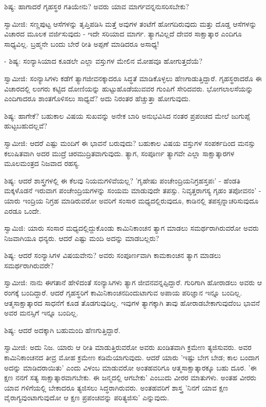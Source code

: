 ಶಿಷ್ಯ: ಹಾಗಾದರೆ ಗೃಹಸ್ಥರ ಗತಿಯೇನು? ಅವರು ಯಾವ ಮಾರ್ಗವನ್ನನುಸರಿಸಬೇಕು?

ಸ್ವಾಮೀಜಿ: ಸಣ್ಣಪುಟ್ಟ ಆಸೆಗಳನ್ನು ತೃಪ್ತಿಪಡಿಸಿ ಮತ್ತೆ ಅವುಗಳ ತಂಟೆಗೆ ಹೋಗದಿರುವುದು ಮತ್ತು ದೊಡ್ಡ ಆಸೆಗಳನ್ನು ವಿಚಾರದ ಮೂಲಕ ವರ್ಜಿಸುವುದು - ಇದೇ ಸರಿಯಾದ ಮಾರ್ಗ. ತ್ಯಾಗವಿಲ್ಲದೆ ದೇವರ ಸಾಕ್ಷಾತ್ಕಾರ ಎಂದಿಗೂ ಸಾಧ್ಯವಿಲ್ಲ. ಬ್ರಹ್ಮನೇ ಬಂದು ಬೇರೆ ರೀತಿ ಅಪ್ಪಣೆ ಮಾಡಿದರೂ ಅಸಾಧ್ಯ!

- ಶಿಷ್ಯ: ಸಂನ್ಯಾಸಿಯಾದ ಕೂಡಲೇ ಎಲ್ಲಾ ವಸ್ತುಗಳ ಮೇಲಿನ ಮೋಹವೂ ಹೋಗುತ್ತದೆಯೆ?

ಸ್ವಾಮೀಜಿ: ಸಂನ್ಯಾಸಿಗಳು ಕಡೆಗೆ ತ್ಯಾಗಜೀವನಕ್ಕಾದರೂ ಸಿದ್ಧತೆ ಮಾಡಿಕೊಳ್ಳಲು ಹೆಣಗಾಡುತ್ತಿದ್ದಾರೆ. ಗೃಹಸ್ಥರಾದರೊ ಈ ವಿಚಾರದಲ್ಲಿ ಲಂಗರು ಕಟ್ಟಿದ ದೋಣಿಯನ್ನು ಹುಟ್ಟುಹೊಡೆಯುವವರ ಗುಂಪಿಗೆ ಸೇರಿದವರು. ಭೋಗಲಾಲಸೆಯನ್ನು ಎಂದಿಗಾದರೂ ಶಾಂತಗೊಳಿಸಲು ಸಾಧ್ಯವೆ? ಅದು ನಿರಂತರ ಹೆಚ್ಚುತ್ತಾ ಹೋಗುವುದು.

ಶಿಷ್ಯ: ಹಾಗೇಕೆ? ಬಹುಕಾಲ ವಿಷಯ ಸುಖವನ್ನು ಅನೇಕ ಬಾರಿ ಅನುಭವಿಸಿದ ನಂತರ ಪ್ರಪಂಚದ ಮೇಲೆ ಜುಗುಪ್ಸೆ ಹುಟ್ಟಬಹುದಲ್ಲವೆ?

ಸ್ವಾಮೀಜಿ: ಆದರೆ ಎಷ್ಟು ಮಂದಿಗೆ ಈ ಭಾವನೆ ಬರುವುದು? ಬಹುಕಾಲ ವಿಷಯ ವಸ್ತುಗಳ ಸಂಪರ್ಕದಿಂದ ಮನಸ್ಸು ಕಲುಷಿತವಾಗಿ ಅದರ ಮುದ್ರೆ ಚಿರಮುದ್ರಿತವಾಗುವುದು. ತ್ಯಾಗ, ಸಂಪೂರ್ಣ ತ್ಯಾಗವೇ ಎಲ್ಲಾ ಸಾಕ್ಷಾತ್ಕಾರಗಳ ಮೂಲಮಂತ್ರದ ನಿಜವಾದ ರಹಸ್ಯ.

ಶಿಷ್ಯ: ಆದರೆ ಶಾಸ್ತ್ರಗಳಲ್ಲಿ ಈ ಕೆಲವು ನಿಯಮಗಳಿವೆಯಲ್ಲ? 'ಗೃಹೇಷು ಪಂಚೇಂದ್ರಿಯನಿಗ್ರಹಸ್ತಪಃ' - ಹೆಂಡತಿ ಮಕ್ಕಳೊಡನೆ ಇರುವಾಗ ಪಂಚೇಂದ್ರಿಯಗಳನ್ನು ಸಂಯಮ ಮಾಡುವುದೇ ತಪಸ್ಸು. ನಿವೃತ್ತರಾಗಸ್ಯ ಗೃಹಂ ತಪೋವನಂ' - ಯಾರು ಇಂದ್ರಿಯ ನಿಗ್ರಹ ಮಾಡಿರುವರೋ ಅವರಿಗೆ ಸಂಸಾರ ಮಧ್ಯದಲ್ಲಿರುವುದೂ, ಕಾಡಿನಲ್ಲಿ ತಪಸ್ಸನ್ನಾಚರಿಸುವುದೂ ಎರಡೂ ಒಂದೇ.

ಸ್ವಾಮಿಜಿ: ಯಾರು ಸಂಸಾರ ಮಧ್ಯದಲ್ಲಿದ್ದುಕೊಂಡು ಕಾಮಿನಿಕಾಂಚನ ತ್ಯಾಗ ಮಾಡಲು ಸಮರ್ಥರಾಗಿರುವರೋ ಅವರು ನಿಜವಾಗಿಯೂ ಧನ್ಯರು. ಆದರೆ ಎಷ್ಟು ಮಂದಿ ಅದನ್ನು ಮಾಡಬಲ್ಲರು?

ಶಿಷ್ಯ: ಆದರೆ ಸಂನ್ಯಾಸಿಗಳ ವಿಷಯವೇನು? ಅವರು ಸಂಪೂರ್ಣವಾಗಿ ಕಾಮಕಾಂಚನ ತ್ಯಾಗ ಮಾಡಲು ಸಮರ್ಥರಾಗಿರುವರೇ?

ಸ್ವಾಮೀಜಿ: ನಾನು ಈಗತಾನೆ ಹೇಳಿದಂತೆ ಸಂನ್ಯಾಸಿಗಳು ತ್ಯಾಗ ಜೀವನವನ್ನಪ್ಪಿದ್ದಾರೆ. ಗುರಿಗಾಗಿ ಹೋರಾಡಲು ಅವರು ಆ ರಂಗಕ್ಕೆ ಬಂದಿದ್ದಾರೆ. ಆದರೆ ಗೃಹಸ್ಥರಿಗೆ ಕಾಮಿನಿಕಾಂಚನದಿಂದುಟಾಗುವ ಅಪಾಯ ಪರಿಜ್ಞಾನ ಇನ್ನೂ ಬಂದಿಲ್ಲ. ಆತ್ಮಸಾಕ್ಷಾತ್ಕಾರದ ಸಾಧನೆಗೆ ಕೂಡ ತೊಡಗುವುದಿಲ್ಲ. ಇವುಗಳ ತ್ಯಾಗಕ್ಕಾಗಿ ತಾವು ಹೋರಾಡಬೇಕಾಗುವುದೆಂಬ ಭಾವನೆ ಅವರ ಮನಸ್ಸಿಗೆ ಇನ್ನೂ ಬಂದಿಲ್ಲ.

ಶಿಷ್ಯ: ಆದರೆ ಅದಕ್ಕಾಗಿ ಬಹುಮಂದಿ ಹೆಣಗುತ್ತಿದ್ದಾರೆ.

ಸ್ವಾಮೀಜಿ: ಅದು ನಿಜ. ಯಾರು ಆ ರೀತಿ ಮಾಡುತ್ತಿರುವರೋ ಅವರು ಖಂಡಿತವಾಗಿ ಕ್ರಮೇಣ ತ್ಯಜಿಸುವರು. ಅವರ ಕಾಮಿನಿಕಾಂಚನದ ತೀವ್ರ ಮೋಹ ಕ್ರಮೇಣ ಕಡಿಮೆಯಾಗುವುದು. ಆದರೆ ಯಾರು 'ಇಷ್ಟು ಬೇಗ ಬೇಡ; ಕಾಲ ಬಂದಾಗ ಅದನ್ನು ಮಾಡಿದರಾಯಿತು' ಎಂದು ವಿಳಂಬ ಮಾಡುವರೋ ಅಂತಹವರಿಗೂ ಆತ್ಮಸಾಕ್ಷಾತ್ಕಾರಕ್ಕೂ ಬಹು ದೂರ. 'ಈ ಕ್ಷಣ ನನಗೆ ಸತ್ಯ ಸಾಕ್ಷಾತ್ಕಾರವಾಗಬೇಕು. ಈ ಜನ್ಮದಲ್ಲಿ ಆಗಬೇಕು' ಎಂಬುದು ವೀರರ ಮಾತುಗಳು. ಅಂತಹ ವೀರರು ಯಾವ ಗಳಿಗೆಯಲ್ಲಿ ಬೇಕಾದರೂ ತ್ಯಜಿಸಲು ಸಿದ್ಧರಾಗಿರುವರು. ಅಂತಹವರಿಗೆ ಶಾಸ್ತ್ರ 'ನಿನಗೆ ಯಾವ ಕ್ಷಣ ವೈರಾಗ್ಯವುಂಟಾಗುವುದೋ ಆ ಕ್ಷಣ ಪ್ರಪಂಚವನ್ನು ಪರಿತ್ಯಜಿಸು' ಎನ್ನುವುದು.

